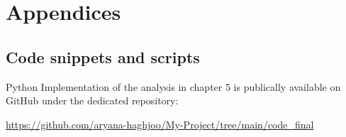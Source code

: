 \documentclass[12pt, TexShade, letterpaper]{report}
\begin{document}

\chapter{Appendices}
\section{Code snippets and scripts}	
Python Implementation of the analysis in chapter 5 is publically available on GitHub under the dedicated repository:\par
\centering
\href{https://github.com/aryana-haghjoo/My-Project/tree/main/code_final}{https://github.com/aryana-haghjoo/My-Project/tree/main/code\_final}

\label{chap:appendix,sub:code}
	{
	
	
	
	
	}
\end{document}
